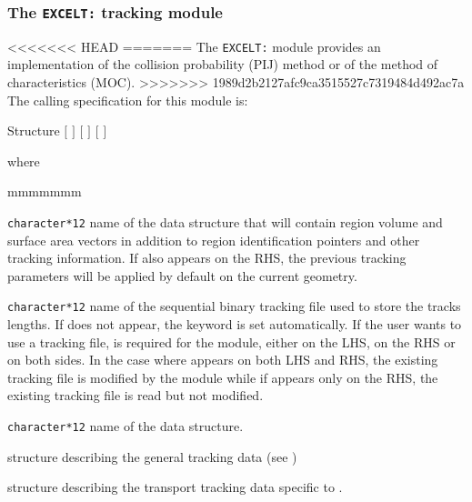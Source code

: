 \subsubsection{The {\tt EXCELT:} tracking module}\label{sect:EXCELLData}

<<<<<<< HEAD
=======
The {\tt EXCELT:} module provides an implementation of the collision probability (PIJ) method or of the method of characteristics (MOC).
>>>>>>> 1989d2b2127afc9ca3515527c7319484d492ac7a
The calling specification for this module is:

\begin{DataStructure}{Structure }
 $[$  $]$
\moc{:=}  $[$  $]$ $[$  $]$ 
 \moc{::}   
\end{DataStructure}

\noindent  where
\begin{ListeDeDescription}{mmmmmmm}

\item[\dusa{TRKNAM}] {\tt character*12} name of the  data
structure that will contain region volume and surface area vectors in
addition to region identification pointers and other tracking information.
If  also appears on the RHS, the previous tracking 
parameters will be applied by default on the current geometry.

\item[\dusa{TRKFIL}] {\tt character*12} name of the sequential binary tracking
file  used to store the tracks lengths. If  does not appear, the keyword
 is set automatically. If the user wants to use a tracking file,
 is required for the  module, either on the LHS, on the RHS or on both sides. In
the case where  appears on both LHS and RHS, the existing tracking
file is modified by the module while if  appears only on the RHS,
the existing tracking file is read but not modified.

\item[\dusa{GEONAM}] {\tt character*12} name of the  data
structure.

\item[\dstr{desctrack}] structure describing the general tracking data (see
)

\item[\dstr{descexcel}] structure describing the transport tracking data
specific to .

\end{ListeDeDescription}

